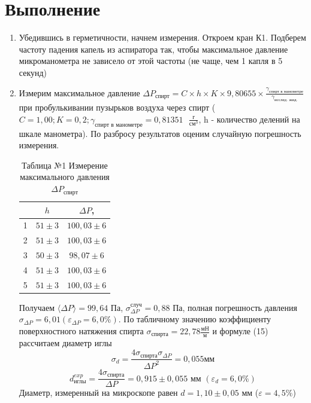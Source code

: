 \documentclass[a4paper]{article}
\begin{document}
\section{Выполнение}
\begin{enumerate}
\item Убедившись в герметичности, начнем измерения. Откроем кран К1. Подберем частоту падения капель из аспиратора так, чтобы максимальное давление микроманометра не зависело от этой частоты (не чаще, чем 1 капля в 5 секунд)
\item Измерим максимальное давление $\Delta P_{\text{спирт}} = C \times h \times K \times 9,80655 \times \frac{\gamma_{\text{спирт в манометре}}}{\gamma_{\text{исслед. жид.}}}$ при пробулькивании пузырьков воздуха через спирт ($C = 1,00; K = 0,2; \gamma_{\text{спирт в манометре}} = 0,81351 \text{ } \frac{\text{г}}{\text{см}^3}$, h - количество делений на шкале манометра). По разбросу результатов оценим случайную погрешность измерения.

\begin{table}[h!] 
	\caption{Таблица №1 Измерение максимального давления $\Delta P_{\text{спирт}}$}
	\begin{center}
		\begin{tabular}{|*{3}{c|}}
			\hline
			\textnumero  & $h$ & $\Delta P$, \text{Па} \\ \hline
			1&	$51 \pm 3$&	$100,03\pm 6$\\ \hline
			2&$51 \pm 3$&	$100,03\pm 6$\\ \hline
			3&	$50 \pm 3$&	$98,07\pm 6$\\ \hline
			4&	$51 \pm 3$&	$100,03\pm 6$\\ \hline
			5&	$51 \pm 3$&	$100,03\pm 6$\\ \hline
		\end{tabular}
	\end{center}
\end{table}
Получаем $\langle \Delta P\rangle = 99,64 $ Па, $\sigma_{\Delta P}^{\text{случ}} = 0,88$ Па, полная погрешность давления $\sigma_{\Delta P} = 6,01 (\varepsilon_{\Delta P} = 6,0 \%)$. По табличному значению коэффициенту поверхностного натяжения спирта $\sigma_{\text{спирта}} = 22,78 \frac{\text{мН}}{\text{м}}$ и формуле (15) рассчитаем диаметр иглы
\begin{equation*}
	\sigma_{d} = \frac{4 \sigma_{\text{спирта}} \sigma_{\Delta P}}{{\Delta P}^2}=0,055 \text{мм}
\end{equation*}
\begin{equation*}
	d_{\text{иглы}}^{exp} = \frac{4 \sigma_{\text{спирта}}}{{\Delta P}}=0,915 \pm 0,055 \text{ мм }(\varepsilon_{d} = 6,0\%)
\end{equation*}
Диаметр, измеренный на микроскопе равен $d = 1,10 \pm 0,05 \text{ мм}$ ($\varepsilon = 4,5\%$)


\end{enumerate}
\end{document}
